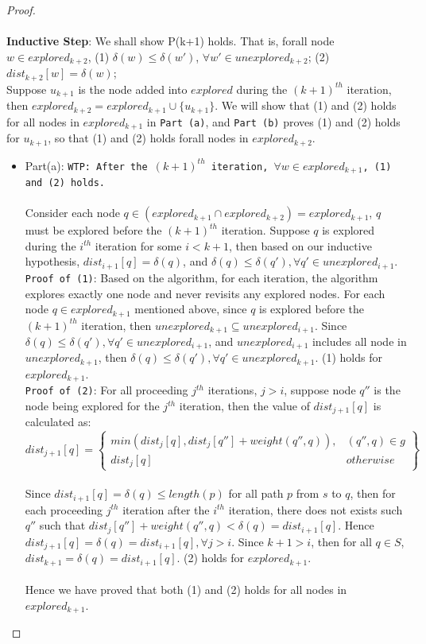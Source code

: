 \documentclass[11pt, oneside]{article}   	%
\theoremstyle{definition}
\begin{document}
\begin{proof}
\\\\
\textbf{Inductive Step}: We shall show P(k+1) holds. That is, forall node $w \in explored_{k+2}$, (1) $\delta(w) \leq \delta(w')$, $\forall w' \in unexplored_{k+2}$; (2) $dist_{k+2}[w] = \delta(w)$;
\\
Suppose $u_{k+1}$ is the node added into $explored$ during the $(k+1)^{th}$ iteration, then $explored_{k+2} = explored_{k+1} \cup \{u_{k+1}\}$. We will show that (1) and (2) holds for all nodes in $explored_{k+1}$ in \texttt{Part (a)}, and \texttt{Part (b)} proves (1) and (2) holds for $u_{k+1}$, so that (1) and (2) holds forall nodes in $explored_{k+2}$. 
\begin{itemize}
  \item Part(a): \texttt{WTP: After the $(k+1)^{th}$ iteration, $\forall w \in explored_{k+1}$, (1) and (2) holds.} 
  \\\\
  Consider each node $q \in (explored_{k+1} \cap explored_{k+2}) = explored_{k+1}$, $q$ must be explored before the $(k+1)^{th}$ iteration. Suppose $q$ is explored during the $i^{th}$ iteration for some $i < k+1$, then based on our inductive hypothesis, $dist_{i+1}[q] = \delta(q)$, and $\delta(q) \leq \delta(q'), \forall q' \in unexplored_{i+1}$. 
  \\
  \texttt{Proof of (1)}: Based on the algorithm, for each iteration, the algorithm explores exactly one node and never revisits any explored nodes. For each node $q \in explored_{k+1}$ mentioned above, since $q$ is explored before the $(k+1)^{th}$ iteration, then $unexplored_{k+1} \subseteq unexplored_{i+1}$. Since $\delta(q) \leq \delta(q'), \forall q' \in unexplored_{i+1}$, and $unexplored_{i+1}$ includes all node in $unexplored_{k+1}$, then $\delta(q) \leq \delta(q'), \forall q' \in unexplored_{k+1}$. (1) holds for $explored_{k+1}$. 
  \\
  \texttt{Proof of (2)}: For all proceeding $j^{th}$ iterations, $j > i$, suppose node $q''$ is the node being explored for the $j^{th}$ iteration, then the value of $dist_{j+1}[q]$ is calculated as: 
  \\
      \[
        dist_{j+1}[q] = \left.
       \begin{cases} 
          min(dist_j[q], dist_j[q''] + weight(q'', q)), & (q'',q) \in g \\ 
          dist_j[q] & otherwise 
        \end{cases}
        \right\}
      \]
  \\
  Since $dist_{i+1}[q] = \delta(q) \leq length(p)$ for all path $p$ from $s$ to $q$, then for each proceeding $j^{th}$ iteration after the $i^{th}$ iteration, there does not exists such $q''$ such that $dist_j[q''] + weight(q'', q) < \delta(q) = dist_{i+1}[q]$. Hence $dist_{j+1}[q] = \delta(q) = dist_{i+1}[q], \forall j > i$. Since $k+1 > i$, then for all $q \in S$, $dist_{k+1} = \delta(q) = dist_{i+1}[q]$. (2) holds for $explored_{k+1}$. 
  \\\\
  Hence we have proved that both (1) and (2) holds for all nodes in $explored_{k+1}$.



\end{itemize}
\end{proof}
\end{document}
